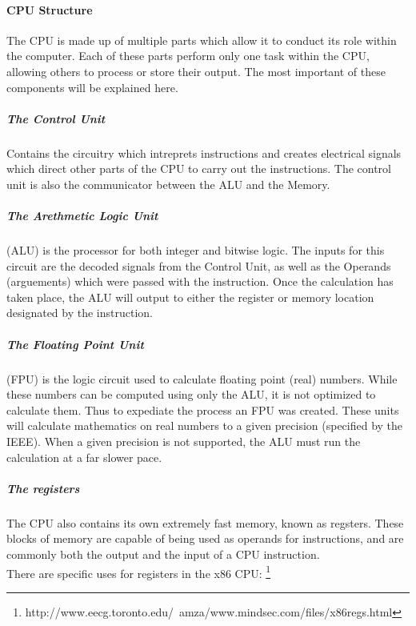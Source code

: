 \documentclass[a4paper,11pt,draft]{article}
\begin{document}
			\paragraph{CPU Structure}
				The CPU is made up of multiple parts which allow it to conduct its role within the computer. 
				Each of these parts perform only one task within the CPU, allowing others to process or store their output. 
				The most important of these components will be explained here. 
				\subparagraph{The Control Unit}
					Contains the circuitry which intreprets instructions and creates electrical signals which direct other parts of the CPU to carry out the instructions. 
					The control unit is also the communicator between the ALU and the Memory.
				\subparagraph{The Arethmetic Logic Unit}
					(ALU) is the processor for both integer and bitwise logic. 
					The inputs for this circuit are the decoded signals from the Control Unit, as well as the Operands (arguements) which were passed with the instruction. 
					Once the calculation has taken place, the ALU will output to either the register or memory location designated by the instruction. 
				\subparagraph{The Floating Point Unit}
					(FPU) is the logic circuit used to calculate floating point (real) numbers. 
					While these numbers can be computed using only the ALU, it is not optimized to calculate them.
					Thus to expediate the process an FPU was created. 
					These units will calculate mathematics on real numbers to a given precision (specified by the IEEE). %
					When a given precision is not supported, the ALU must run the calculation at a far slower pace. 
				\subparagraph{The registers}
					The CPU also contains its own extremely fast memory, known as regsters. 
					These blocks of memory are capable of being used as operands for instructions, and are commonly both the output and the input of a CPU instruction.\\ 
					There are specific uses for registers in the x86 CPU: \footnote{http://www.eecg.toronto.edu/~amza/www.mindsec.com/files/x86regs.html}
\end{document}
